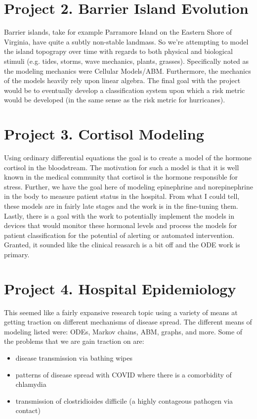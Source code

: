 \documentclass[12pt]{amsart}
\begin{document}
\begin{onehalfspace}
        \section{Project 2. Barrier Island Evolution}
        Barrier islands, take for example Parramore Island on the Eastern Shore of Virginia, have quite a subtly
        non-stable landmass. So we're attempting to model the island topograpy over time with regards to both physical and
        biological stimuli (e.g. tides, storms, wave mechanics, plants, grasses). Specifically noted as the modeling
        mechanics were Cellular Models/ABM. Furthermore, the mechanics of the models heavily rely upon linear algebra.
        The final goal with the project would be to eventually develop a classification system upon which a risk
        metric would be developed (in the same sense as the risk metric for hurricanes).

        \section{Project 3. Cortisol Modeling}
        Using ordinary differential equations the goal is to create a model of the hormone cortisol in the bloodstream.
        The motivation for such a model is that it is well known in the medical community that cortisol is the hormone
        responsible for stress. Further, we have the goal here of modeling epinephrine and norepinephrine in the body
        to measure patient status in the hospital. From what I could tell, these models are in fairly late stages and
        the work is in the fine-tuning them. Lastly, there is a goal with the work to potentially implement the models
        in devices that would monitor these hormonal levels and process the models for patient classification for
        the potential of alerting or automated intervention. Granted, it sounded like the clinical reasarch is a bit off
        and the ODE work is primary.

        \section{Project 4. Hospital Epidemiology}
        This seemed like a fairly expansive research topic using a variety of means at getting traction on different
        mechanisms of disease spread. The different means of modeling listed were: ODEs, Markov chains, ABM, graphs,
        and more. Some of the problems that we are gain traction on are:
        \begin{itemize}
            \item disease transmission via bathing wipes
            \item patterns of disease spread with COVID where there is a comorbidity of chlamydia
            \item transmission of clostridioides difficile (a highly contageous pathogen via contact)
        \end{itemize}


\end{onehalfspace}
\end{document}
